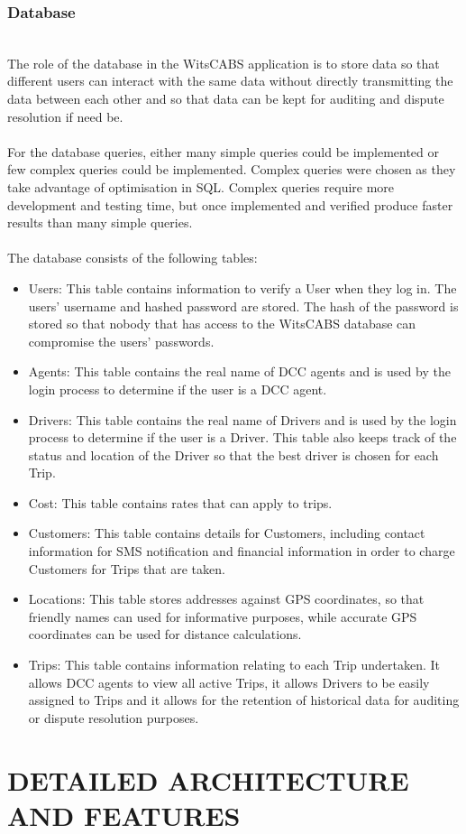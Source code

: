 \documentclass[10pt, onecolumn]{witseiepaper}
\begin{document}
\subsubsection{Database}\mbox{}\\
The role of the database in the WitsCABS application is to store data so that different users can interact with the same data without directly transmitting the data between each other and so that data can be kept for auditing and dispute resolution if need be.
\\ \\
For the database queries, either many simple queries could be implemented or few complex queries could be implemented. Complex queries were chosen as they take advantage of optimisation in SQL. Complex queries require more development and testing time, but once implemented and verified produce faster results than many simple queries.
\\ \\
The database consists of the following tables:
\begin{itemize}
\item Users: This table contains information to verify a User when they log in. The users' username and hashed password are stored. The hash of the password is stored so that nobody that has access to the WitsCABS database can compromise the users' passwords.
\item Agents: This table contains the real name of DCC agents and is used by the login process to determine if the user is a DCC agent.
\item Drivers: This table contains the real name of Drivers and is used by the login process to determine if the user is a Driver. This table also keeps track of the status and location of the Driver so that the best driver is chosen for each Trip.
\item Cost: This table contains rates that can apply to trips.
\item Customers: This table contains details for Customers, including contact information for SMS notification and financial information in order to charge Customers for Trips that are taken.
\item Locations: This table stores addresses against GPS coordinates, so that friendly names can used for informative purposes, while accurate GPS coordinates can be used for distance calculations.
\item Trips: This table contains information relating to each Trip undertaken. It allows DCC agents to view all active Trips, it allows Drivers to be easily assigned to Trips and it allows for the retention of historical data for auditing or dispute resolution purposes.
\end{itemize}

\section{DETAILED ARCHITECTURE AND FEATURES}





%



\end{document}
